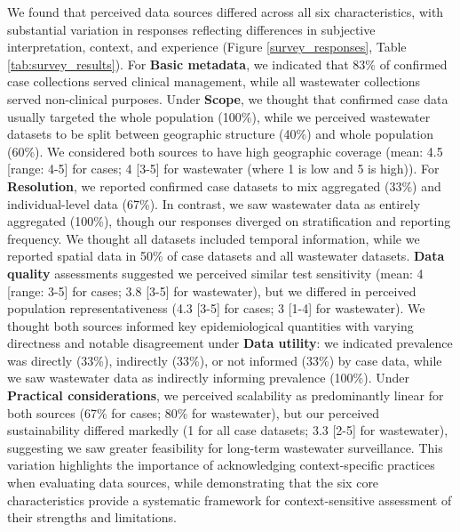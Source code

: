 \documentclass{article}
\begin{document}
We found that perceived data sources differed across all six characteristics, with substantial variation in responses reflecting differences in subjective interpretation, context, and experience (Figure \ref{survey_responses}, Table \ref{tab:survey_results}). For \textbf{Basic metadata}, we indicated that 83\% of confirmed case collections served clinical management, while all wastewater collections served non-clinical purposes. Under \textbf{Scope}, we thought that confirmed case data usually targeted the whole population (100\%), while we perceived wastewater datasets to be split between geographic structure (40\%) and whole population (60\%). We considered both sources to have high geographic coverage (mean: 4.5 [range: 4-5] for cases; 4 [3-5] for wastewater (where 1 is low and 5 is high)). For \textbf{Resolution}, we reported confirmed case datasets to mix aggregated (33\%) and individual-level data (67\%). In contrast, we saw wastewater data as entirely aggregated (100\%), though our responses diverged on stratification and reporting frequency. We thought all datasets included temporal information, while we reported spatial data in 50\% of case datasets and all wastewater datasets. \textbf{Data quality} assessments suggested we perceived similar test sensitivity (mean: 4 [range: 3-5] for cases; 3.8 [3-5] for wastewater), but we differed in perceived population representativeness (4.3 [3-5] for cases; 3 [1-4] for wastewater). We thought both sources informed key epidemiological quantities with varying directness and notable disagreement under \textbf{Data utility}: we indicated prevalence was directly (33\%), indirectly (33\%), or not informed (33\%) by case data, while we saw wastewater data as indirectly informing prevalence (100\%). Under \textbf{Practical considerations}, we perceived scalability as predominantly linear for both sources (67\% for cases; 80\% for wastewater), but our perceived sustainability differed markedly (1 for all case datasets; 3.3 [2-5] for wastewater), suggesting we saw greater feasibility for long-term wastewater surveillance. This variation highlights the importance of acknowledging context-specific practices when evaluating data sources, while demonstrating that the six core characteristics provide a systematic framework for context-sensitive assessment of their strengths and limitations.
\end{document}
